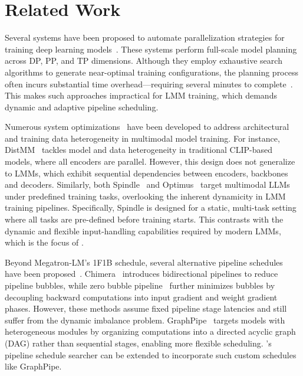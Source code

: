 \section{Related Work}

Several systems have been proposed to automate parallelization strategies for training deep learning models~\cite{alpa-osdi22,nnscaler-osdi24,unity-osdi22}. These systems perform full-scale model planning across DP, PP, and TP dimensions. Although they employ exhaustive search algorithms to generate near-optimal training configurations, the planning process often incurs substantial time overhead—requiring several minutes to complete~\cite{nnscaler-osdi24}. This makes such approaches impractical for LMM training, which demands dynamic and adaptive pipeline scheduling.

Numerous system optimizations~\cite{distmm-nsdi24,optimus-atc25,disttrain-arxiv24,spindle-asplos25,orch-mllm-arxiv25,cornstarch-arxiv25,diffusionpipe-mlsys24} have been developed to address architectural and training data heterogeneity in multimodal model training. For instance, DistMM~\cite{distmm-nsdi24} tackles model and data heterogeneity in traditional CLIP-based models, where all encoders are parallel. However, this design does not generalize to LMMs, which exhibit sequential dependencies between encoders, backbones and decoders. Similarly, both Spindle~\cite{spindle-asplos25} and Optimus~\cite{optimus-atc25} target multimodal LLMs under predefined training tasks, overlooking the inherent dynamicity in LMM training pipelines.
Specifically, Spindle is designed for a static, multi-task setting where all tasks are pre-defined before training starts. This contrasts with the dynamic and flexible input-handling capabilities required by modern LMMs, which is the focus of \sys{}.

Beyond Megatron-LM's 1F1B schedule, several alternative pipeline schedules have been proposed~\cite{chimera-sc21,hanayo-sc23,zero-bubble-iclr24,graph-pipe-asplos25}. Chimera~\cite{chimera-sc21} introduces bidirectional pipelines to reduce pipeline bubbles, while zero bubble pipeline~\cite{zero-bubble-iclr24} further minimizes bubbles by decoupling backward computations into input gradient and weight gradient phases. However, these methods assume fixed pipeline stage latencies and still suffer from the dynamic imbalance problem. GraphPipe~\cite{graph-pipe-asplos25} targets models with heterogeneous modules by organizing computations into a directed acyclic graph (DAG) rather than sequential stages, enabling more flexible scheduling. \sys{}'s pipeline schedule searcher can be extended to incorporate such custom schedules like GraphPipe.

